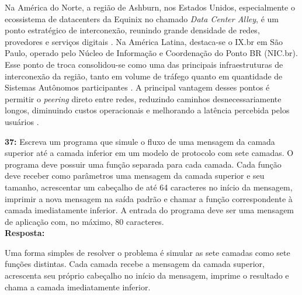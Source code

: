\documentclass[12pt,a4paper]{report}
\begin{document}
Na América do Norte, a região de Ashburn, nos Estados Unidos, especialmente o ecossistema de datacenters da Equinix no chamado \textit{Data Center Alley}, é um ponto estratégico de interconexão, reunindo grande densidade de redes, provedores e serviços digitais \cite{lodhi2014}. Na América Latina, destaca-se o IX.br em São Paulo, operado pelo Núcleo de Informação e Coordenação do Ponto BR (NIC.br). Esse ponto de troca consolidou-se como uma das principais infraestruturas de interconexão da região, tanto em volume de tráfego quanto em quantidade de Sistemas Autônomos participantes \cite{ixbr_estatisticas}. A principal vantagem desses pontos é permitir o \textit{peering} direto entre redes, reduzindo caminhos desnecessariamente longos, diminuindo custos operacionais e melhorando a latência percebida pelos usuários \cite{chatzis2013}.

\vspace{0.6cm}

\noindent \textbf{37:} Escreva um programa que simule o fluxo de uma mensagem da camada superior até a camada inferior em um modelo de protocolo com sete camadas. O programa deve possuir uma função separada para cada camada. Cada função deve receber como parâmetros uma mensagem da camada superior e seu tamanho, acrescentar um cabeçalho de até 64 caracteres no início da mensagem, imprimir a nova mensagem na saída padrão e chamar a função correspondente à camada imediatamente inferior. A entrada do programa deve ser uma mensagem de aplicação com, no máximo, 80 caracteres. \\
\textbf{Resposta:}

Uma forma simples de resolver o problema é simular as sete camadas como sete funções distintas. Cada camada recebe a mensagem da camada superior, acrescenta seu próprio cabeçalho no início da mensagem, imprime o resultado e chama a camada imediatamente inferior.
\end{document}
